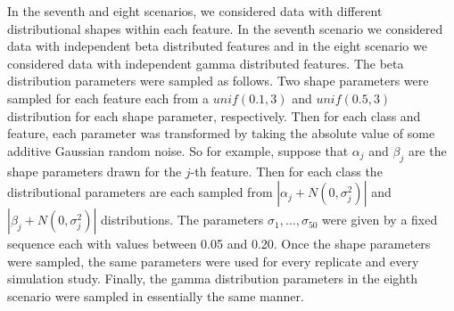 \documentclass{article}
\begin{document}
In the seventh and eight scenarios, we considered data with different
distributional shapes within each feature.  In the seventh scenario we
considered data with independent beta distributed features and in the eight
scenario we considered data with independent gamma distributed features.  The
beta distribution parameters were sampled as follows.  Two shape parameters were
sampled for each feature each from a $\mathit{unif}(0.1, 3)$ and
$\mathit{unif}(0.5, 3)$ distribution for each shape parameter, respectively.
Then for each class and feature, each parameter was transformed by taking the
absolute value of some additive Gaussian random noise.  So for example, suppose
that $\alpha_j$ and $\beta_j$ are the shape parameters drawn for the $j$-th
feature.  Then for each class the distributional parameters are each sampled
from $|\alpha_j + N(0, \sigma_j^2)|$ and $|\beta_j + N(0, \sigma_j^2)|$
distributions.  The parameters $\sigma_1, \dots, \sigma_{50}$ were given by a
fixed sequence each with values between 0.05 and 0.20.  Once the shape
parameters were sampled, the same parameters were used for every replicate and
every simulation study.  Finally, the gamma distribution parameters in the
eighth scenario were sampled in essentially the same manner.



\end{document}
